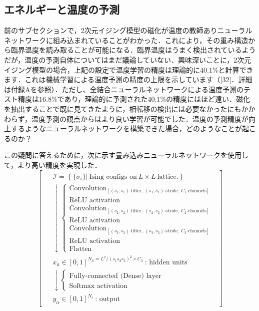 \documentclass[a4paper,11pt]{jsarticle}
\begin{document}
\subsection{エネルギーと温度の予測}
前のサブセクションで，2次元イジング模型の磁化が温度の教師ありニューラルネットワークに組み込まれていることがわかった．これにより，その重み構造から臨界温度を読み取ることが可能になる．臨界温度はうまく検出されているようだが，温度の予測自体についてはまだ議論していない．興味深いことに，2次元イジング模型の場合，上記の設定で温度学習の精度は理論的に$40.1\%$と計算できます．これは機械学習による温度予測の精度の上限を示しています（[32]．詳細は付録Aを参照）．ただし、全結合ニューラルネットワークによる温度予測のテスト精度は$16.8\%$であり，理論的に予測された$40.1\%$の精度にはほど遠い．磁化を抽出することで既に見てきたように，相転移の検出には必要なかったにもかかわらず，温度予測の観点からはより良い学習が可能でした．温度の予測精度が向上するようなニューラルネットワークを構築できた場合，どのようなことが起こるのか？\par
この疑問に答えるために，次に示す畳み込みニューラルネットワークを使用して，より高い精度を実現した．
\begin{equation}
  \begin{bmatrix}
    \begin{aligned}
       & \mathcal{I} = \left\{ \{ \sigma_i \} \Big| \ \text{Ising configs on} \ L \times L \ \text{lattice.} \right\}        \\
       & \downarrow
      \begin{cases}
        \text{Convolution}_{[(s_1,s_1)\text{-filter}, \ (s_1,s_1)\text{-stride}, \ C_1\text{-channels}]} \\
        \text{ReLU activation}                                                                           \\
        \text{Convolution}_{[(s_2,s_2)\text{-filter}, \ (s_2,s_2)\text{-stride}, \ C_2\text{-channels}]} \\
        \text{ReLU activation}                                                                           \\
        \text{Convolution}_{[(s_3,s_3)\text{-filter}, \ (s_3,s_3)\text{-stride}, \ C_3\text{-channels}]} \\
        \text{ReLU activation}                                                                           \\
        \text{Flatten}
      \end{cases} \\
       & x_a \in [0,1]^{N_h = L^2/(s_1s_2s_3)^2 \times C_3} \ \text{: hidden units}                                          \\
       & \downarrow
      \begin{cases}
        \text{Fully-connected (Dense) layer} \\
        \text{Softmax activation}
      \end{cases}                                                                                   \\
       & y_{\alpha} \in [0,1]^{N_t} \ \text{: output}
    \end{aligned}
  \end{bmatrix}
\end{equation} \label{conv model}
\end{document}

